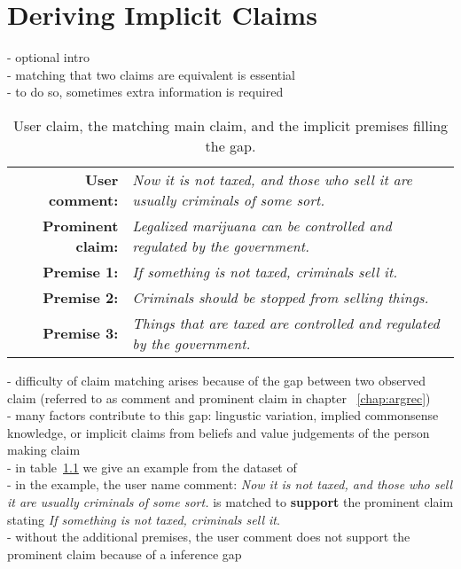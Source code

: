 \chapter{Deriving Implicit Claims}

- optional intro \\
- matching that two claims are equivalent is essential \\
- to do so, sometimes extra information is required \\

\begin{table}
{\normalsize
\begin{tabular}{|@{\ }r@{\ \  }p{}|}
\hline
\textbf{User comment:} & \emph{Now it is not taxed, and those who sell it are usually criminals of some sort.}\\
\textbf{Prominent claim:} & \emph{Legalized marijuana can be controlled and regulated by the government.}\\
\textbf{Premise 1:} & \emph{If something is not taxed, criminals sell it.}\\
\textbf{Premise 2:} & \emph{Criminals should be stopped from selling things.}\\
\textbf{Premise 3:} & \emph{Things that are taxed are controlled and regulated by the government.}\\
\hline
\end{tabular}}
\caption{User claim, the matching main claim, and the implicit premises filling the gap.}
\label{tab:premise_example}
\end{table}

\noindent - difficulty of claim matching arises because of the gap between 
two observed claim (referred to as comment and prominent claim in 
chapter ~\ref{chap:argrec}) \\
- many factors contribute to this gap: lingustic variation, 
implied commonsense knowledge, or implicit claims from beliefs and value
judgements of the person making claim \\
- in table~\ref{tab:premise_example} we give an example from 
the dataset of \citet{hasan2014you} \\
- in the example, the user name comment: 
\emph{Now it is not taxed, and those who sell it are usually criminals of some sort.}
is matched to \textbf{support} the prominent claim stating
\emph{If something is not taxed, criminals sell it}.\\
- without the additional premises, the user comment does not support the prominent 
claim because of a inference gap\\

